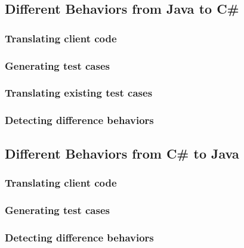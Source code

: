 \subsection{Different Behaviors from Java to C\#}
\label{sec:evaluation:java2csharp}
\subsubsection{Translating client code}
\subsubsection{Generating test cases}
\subsubsection{Translating existing test cases}
\subsubsection{Detecting difference behaviors}
\subsection{Different Behaviors from C\# to Java}
\label{sec:evaluation:csharp2java}
\subsubsection{Translating client code}
\subsubsection{Generating test cases}
\subsubsection{Detecting difference behaviors}


